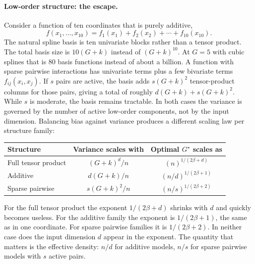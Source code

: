 \documentclass{article}
\begin{document}
\paragraph{Low-order structure: the escape.}
Consider a function of ten coordinates that is purely additive,
\[
f(x_1, \dots, x_{10}) = f_1(x_1) + f_2(x_2) + \cdots + f_{10}(x_{10}).
\]
The natural spline basis is ten univariate blocks rather than a tensor product. The total basis size is $10(G + k)$ instead of $(G + k)^{10}$. At $G = 5$ with cubic splines that is $80$ basis functions instead of about a billion. A function with sparse pairwise interactions has univariate terms plus a few bivariate terms $f_{ij}(x_i, x_j)$. If $s$ pairs are active, the basis adds $s(G+k)^2$ tensor-product columns for those pairs, giving a total of roughly $d(G + k) + s(G + k)^2$. While $s$ is moderate, the basis remains tractable. In both cases the variance is governed by the number of active low-order components, not by the input dimension. Balancing bias against variance produces a different scaling law per structure family:
\smallskip
\begin{center}
\small
\begin{tabular}{@{}lcc@{}}
\toprule
Structure & Variance scales with & Optimal $G^\star$ scales as \\
\midrule
Full tensor product & $(G+k)^d / n$ & $(n)^{1/(2\beta+d)}$ \\[2pt]
Additive & $d(G+k) / n$ & $(n/d)^{1/(2\beta+1)}$ \\[2pt]
Sparse pairwise & $s(G+k)^2 / n$ & $(n/s)^{1/(2\beta+2)}$ \\
\bottomrule
\end{tabular}
\end{center}
\smallskip

\noindent For the full tensor product the exponent $1 / (2\beta + d)$ shrinks with $d$ and quickly becomes useless. For the additive family the exponent is $1 / (2\beta + 1)$, the same as in one coordinate. For sparse pairwise families it is $1 / (2\beta + 2)$. In neither case does the input dimension $d$ appear in the exponent. The quantity that matters is the effective density: $n / d$ for additive models, $n / s$ for sparse pairwise models with $s$ active pairs.
\end{document}
